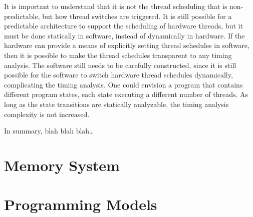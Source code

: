 It is important to understand that it is not the thread scheduling that is non-predictable, but how thread switches are triggered.    
It is still possible for a predictable architecture to support the scheduling of hardware threads, but it must be done statically in software, instead of dynamically in hardware. 
If the hardware can provide a means of explicitly setting thread schedules in software, then it is possible to make the thread schedules transparent to any timing analysis.	 
The software still needs to be carefully constructed, since it is still possible for the software to switch hardware thread schedules dynamically, complicating the timing analysis. 
One could envision a program that contains different program states, each state executing a different number of threads. 
As long as the state transitions are statically analyzable, the timing analysis complexity is not increased.  

In summary, blah blah blah\ldots
\section{Memory System}
\label{section:memory_system}


\section{Programming Models}
\label{chapter:programming_models}


